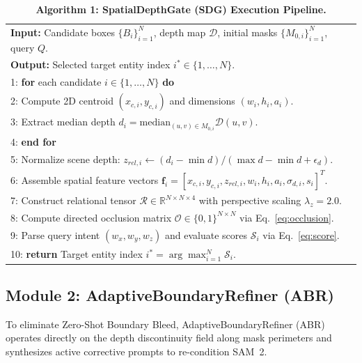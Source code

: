 \documentclass[10pt,twocolumn,letterpaper]{article}
\begin{document}
\begin{table}[ht]
\centering
\footnotesize
\caption{\textbf{Algorithm 1: SpatialDepthGate (SDG) Execution Pipeline.}}
\label{alg:sdg}
\begin{tabularx}{\columnwidth}{X}
\toprule
\textbf{Input:} Candidate boxes $\{B_i\}_{i=1}^N$, depth map $\mathcal{D}$, initial masks $\{M_{0,i}\}_{i=1}^N$, query $Q$. \\
\textbf{Output:} Selected target entity index $i^* \in \{1, \dots, N\}$. \\
\midrule
1: \textbf{for} each candidate $i \in \{1, \dots, N\}$ \textbf{do} \\
2: \quad Compute 2D centroid $(x_{c,i}, y_{c,i})$ and dimensions $(w_i, h_i, a_i)$. \\
3: \quad Extract median depth $d_i = \mathrm{median}_{(u,v) \in M_{0,i}} \mathcal{D}(u,v)$. \\
4: \textbf{end for} \\
5: Normalize scene depth: $z_{rel,i} \leftarrow (d_i - \min d) / (\max d - \min d + \epsilon_d)$. \\
6: Assemble spatial feature vectors $\mathbf{f}_i = [x_{c,i}, y_{c,i}, z_{rel,i}, w_i, h_i, a_i, \sigma_{d,i}, s_i]^T$. \\
7: Construct relational tensor $\mathcal{R} \in \mathbb{R}^{N \times N \times 4}$ with perspective scaling $\lambda_z = 2.0$. \\
8: Compute directed occlusion matrix $\mathcal{O} \in \{0, 1\}^{N \times N}$ via Eq.~\eqref{eq:occlusion}. \\
9: Parse query intent $(w_x, w_y, w_z)$ and evaluate scores $\mathcal{S}_i$ via Eq.~\eqref{eq:score}. \\
10: \textbf{return} Target entity index $i^* = \arg\max_{i=1}^N \mathcal{S}_i$. \\
\bottomrule
\end{tabularx}
\end{table}

\subsection{Module 2: AdaptiveBoundaryRefiner (ABR)}
To eliminate Zero-Shot Boundary Bleed, AdaptiveBoundaryRefiner (ABR) operates directly on the depth discontinuity field along mask perimeters and synthesizes active corrective prompts to re-condition SAM~2.
\end{document}
